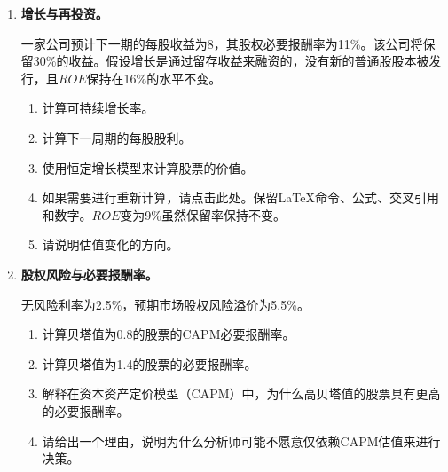 \begin{enumerate}
\begin{enumerate}
\item 计算相应的报价价差比例。

\item 如果报价仍然有效，那么以什么价格可以执行一笔购买2000股的市场订单呢？

\item 如果下达了一个买入限价订单，订单数量是2000股，价格目标是25.00元，而没有任何卖方愿意在25.00元或更低的价格出售股票，那么这个订单在限价订单簿中将会如何处理呢？

\end{enumerate}

\item \textbf{增长与再投资。}

一家公司预计下一期的每股收益为8，其股权必要报酬率为11\%。该公司将保留30\%的收益。假设增长是通过留存收益来融资的，没有新的普通股股本被发行，且\(ROE\)保持在16\%的水平不变。

\begin{enumerate}

\item 计算可持续增长率。

\item 计算下一周期的每股股利。

\item 使用恒定增长模型来计算股票的价值。

\item 如果需要进行重新计算，请点击此处。保留LaTeX命令、公式、交叉引用和数字。\(ROE\)变为9\%虽然保留率保持不变。

\item 请说明估值变化的方向。

\end{enumerate}

\item \textbf{股权风险与必要报酬率。}

无风险利率为2.5\%，预期市场股权风险溢价为5.5\%。

\begin{enumerate}

\item 计算贝塔值为0.8的股票的CAPM必要报酬率。

\item 计算贝塔值为1.4的股票的必要报酬率。

\item 解释在资本资产定价模型（CAPM）中，为什么高贝塔值的股票具有更高的必要报酬率。

\item 请给出一个理由，说明为什么分析师可能不愿意仅依赖CAPM估值来进行决策。

\end{enumerate}

\end{enumerate}

